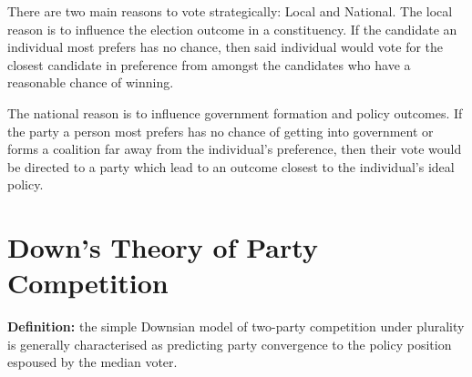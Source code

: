 \documentclass[12pt, letterpaper]{article}
\begin{document}
There are two main reasons to vote strategically: Local and National. The local reason is to influence the election outcome in a constituency. If the candidate an individual most prefers has no chance, then said individual would vote for the closest candidate in preference from amongst the candidates who have a reasonable chance of winning.

The national reason is to influence government formation and policy outcomes. If the party a person most prefers has no chance of getting into government or forms a coalition far away from the individual's preference, then their vote would be directed to a party which lead to an outcome closest to the individual's ideal policy.


\newpage
\section{Down's Theory of Party Competition}
\textbf{Definition:} the simple Downsian model of two-party competition under plurality is generally characterised as predicting party convergence to the policy position espoused by the median voter.
\end{document}
